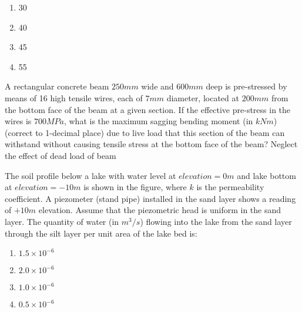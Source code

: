 \documentclass[journal]{IEEEtran}
\begin{document}
\begin{enumerate}
{		\begin{enumerate}
			\item 30
			\item 40
			\item 45
			\item 55
		\end{enumerate}
	\item
	A rectangular concrete beam $250 mm$ wide and $600 mm$ deep is pre-stressed by means of 16 high tensile wires, each of $7 mm$ diameter, located at $200 mm$ from the bottom face of the beam at a given section. If the effective pre-stress in the wires is $700 MPa$, what is the maximum sagging bending moment (in $kNm$) (correct to 1-decimal place) due to live load that this section of the beam can withstand without causing tensile stress at the bottom face of the beam? Neglect the effect of dead load of beam
	\item
	The soil profile below a lake with water level at $elevation = 0m$ and lake bottom at $elevation = -10 m$ is shown in the figure, where $k$ is the permeability coefficient. A piezometer (stand pipe) installed in the sand layer shows a reading of $+10 m$ elevation. Assume that the piezometric head is uniform in the sand layer. The quantity of water (in $m^3/s$) flowing into the lake from the sand layer through the silt layer per unit area of the lake bed is:
	\begin{figure}[H]
    		\centering
    		
    		\caption{}
    		\label{36}
	\end{figure}
		\begin{enumerate}
			\item $1.5 \times 10^{-6}$
			\item $2.0 \times 10^{-6}$
			\item $1.0 \times 10^{-6}$
			\item $0.5 \times 10^{-6}$
		\end{enumerate}

}
\end{enumerate}
\end{document}
